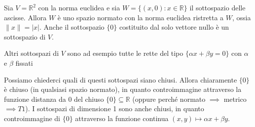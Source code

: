 \begin{example}
    Sia \(V = \mathbb{R}^{2}\) con la norma euclidea e sia \(W = \{(x, 0) : x
    \in \mathbb{R}\}\) il sottospazio delle ascisse. Allora \(W\) è uno spazio
    normato con la norma euclidea ristretta a \(W\), ossia \(\|x\| = |x|\).
    Anche il sottospazio \(\{0\} \) costituito dal solo vettore nullo è un
    sottospazio di \(V\).

    Altri sottospazi di \(V\) sono ad esempio tutte le rette del tipo \(\{\alpha
    x + \beta y = 0\} \) con \(\alpha\) e \(\beta\) fissati

    Possiamo chiederci quali di questi sottospazi siano chiusi. Allora
    chiaramente \(\{0\} \) è chiuso (in qualsiasi spazio normato), in quanto
    controimmagine attraverso la funzione distanza da \(0\) del chiuso \(\{0\}
    \subseteq \mathbb{R} \) (oppure perché normato \(\implies \) metrico
    \(\implies T1\)). I sottospazi di dimensione 1 sono anche chiusi, in quanto
    controimmagine di \(\{0\} \) attraverso la funzione continua \({(x,y)}
    \mapsto \alpha x + \beta y\).
\end{example}


